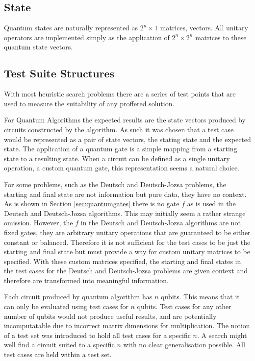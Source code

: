 \subsection{State}
Quantum states are naturally represented as $2^n\times1$ matrices, vectors.
All unitary operators are implemented simply as the application of $2^n\times2^n$ matrices to these quantum state vectors.

\subsection{Test Suite Structures}
\label{sec:testsuitestruc}
With most heuristic search problems there are a series of test points that are used to measure the suitability of any proffered solution.

For Quantum Algorithms the expected results are the state vectors produced by circuits constructed by the algorithm.
As such it was chosen that a test case would be represented as a pair of state vectors, the stating state and the expected state.
The application of a quantum gate is a simple mapping from a starting state to a resulting state.
When a circuit can be defined as a single unitary operation, a custom quantum gate, this representation seems a natural choice.

For some problems, such as the Deutsch and Deutsch-Jozsa problems, the starting and final state are not information but pure data, they have no context.
As is shown in Section \ref{sec:quantumgates} there is no gate $f$ as is used in the Deutsch and Deutsch-Jozsa algorithms.
This may initially seem a rather strange omission.
However, the $f$ in the Deutsch and Deutsch-Jozsa algorithms are not fixed gates, they are arbitrary unitary operations that are guaranteed to be either constant or balanced.
Therefore it is not sufficient for the test cases to be just the starting and final state but must provide a way for custom unitary matrices to be specified.
With these custom matrices specified, the starting and final states in the test cases for the Deutsch and Deutsch-Jozsa problems are given context and therefore are transformed into meaningful information.

Each circuit produced by quantum algorithm has $n$ qubits.
This means that it can only be evaluated using test cases for $n$ qubits.
Test cases for any other number of qubits would not produce useful results, and are potentially incomputatable due to incorrect matrix dimensions for multiplication.
The notion of a test set was introduced to hold all test cases for a specific $n$.
A search might well find a circuit suited to a specific $n$ with no clear generalisation possible.
All test cases are held within a test set.

